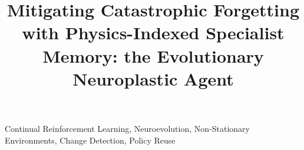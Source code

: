 \documentclass[conference]{IEEEtran}
\begin{document}
\title{Mitigating Catastrophic Forgetting with Physics-Indexed Specialist Memory: the Evolutionary Neuroplastic Agent}

\author{
\and
{}
}

\maketitle

\begin{abstract}

\end{abstract}

\begin{IEEEkeywords}
Continual Reinforcement Learning, Neuroevolution, Non-Stationary Environments, Change Detection, Policy Reuse
\end{IEEEkeywords}














\appendices

\end{document}
